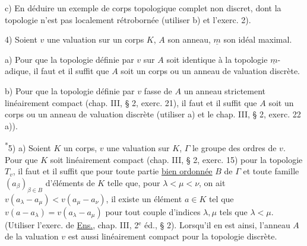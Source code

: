 c) En déduire un exemple de corps topologique complet non discret, dont la topologie n'est pas localement rétrobornée (utiliser b) et l'exerc. 2).

4) Soient $v$ une valuation sur un corps $K$, $A$ son anneau, $\underline m$ son idéal maximal.

a) Pour que la topologie définie par $v$ sur $A$ soit identique à la topologie $\underline m$-adique, il faut et il suffit que $A$ soit un corps ou un anneau de valuation discrète.

b) Pour que la topologie définie par $v$ fasse de $A$ un anneau strictement linéairement compact (chap. III, § 2, exerc. 21), il faut et il suffit que $A$ soit un corps ou un anneau de valuation discrète (utiliser a) et le chap. III, § 2, exerc. 22 a)).

\textsuperscript{*}5) a) Soient $K$ un corps, $v$ une valuation sur $K$, $\Gamma$ le groupe des ordres de $v$. Pour que $K$ soit linéairement compact (chap. III, § 2, exerc. 15) pour la topologie $T_v$, il faut et il suffit que pour toute partie \uline{bien ordonnée} $B$ de $\Gamma$ et toute famille $(a_\beta)_{\beta\in B}$ d'éléments de $K$ telle que, pour $\lambda<\mu<\nu$, on ait $v(a_\lambda-a_\mu)<v(a_\mu-a_\nu)$, il existe un élément $a\in K$ tel que $v(a-a_\lambda)=v(a_\lambda-a_\mu)$ pour tout couple d'indices $\lambda,\mu$ tels que $\lambda<\mu$. (Utiliser l'exerc. de \uline{Ens.}, chap. III, 2$^{\mathrm e}$ éd., § 2). Lorsqu'il en est ainsi, l'anneau $A$ de la valuation $v$ est aussi linéairement compact pour la topologie discrète.

